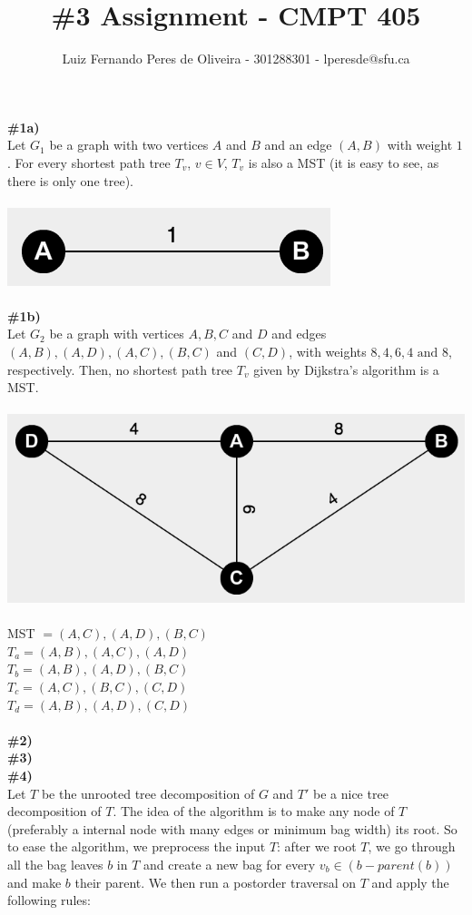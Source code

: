 \documentclass{article}
\title{\#3 Assignment - CMPT 405}
\author{Luiz Fernando Peres de Oliveira - 301288301 - lperesde@sfu.ca}
\begin{document}
\maketitle
\textbf{\#1a)}
\\
Let $G_1$ be a graph with two vertices $A$ and $B$ and an edge $(A, B)$ with weight $1$. For every shortest path tree $T_v$, $v \in V$, $T_v$ is also a MST (it is easy to see, as there is only one tree).
\\
\\
\includegraphics[scale=0.6]{simple_graph_hw3}
\\
\\
\textbf{\#1b)}
\\
Let $G_2$ be a graph with vertices $A, B, C$ and $D$ and edges $(A, B), (A, D), (A,C), (B,C)$ and $(C,D)$, with weights $8, 4, 6, 4 \text{ and } 8$, respectively. Then, no shortest path tree $T_v$ given by Dijkstra's algorithm is a MST.
\\
\\
\includegraphics[scale=0.4]{complex_graph_hw3}
\\
\\
MST $= (A,C), (A,D), (B,C)$
\\
$T_a = (A, B), (A, C), (A, D)$
\\
$T_b = (A, B), (A, D), (B, C)$
\\
$T_c = (A, C), (B, C), (C, D)$
\\
$T_d = (A, B), (A, D), (C, D)$
\\
\\
\textbf{\#2)}
\\
\textbf{\#3)}
\\
\textbf{\#4)}
\\
Let $T$ be the unrooted tree decomposition of $G$ and $T'$ be a nice tree decomposition of $T$. The idea of the algorithm is to make any node of $T$ (preferably a internal node with many edges or minimum bag width) its root. So to ease the algorithm, we  preprocess the input $T$: after we root $T$, we go through all the bag leaves $b$ in $T$ and create a new bag for every $v_b \in (b - parent(b))$ and make $b$ their parent. We then run a postorder traversal on $T$ and apply the following rules:
\end{document}

